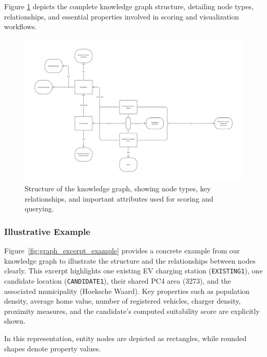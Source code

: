 \documentclass{article}
\begin{document}
Figure \ref{fig:graph_structure} depicts the complete knowledge graph structure, detailing node types, relationships, and essential properties involved in scoring and visualization workflows.

\begin{figure}[htbp]
	\centering
	\includegraphics[width=\textwidth]{KnowledgeGraphGroup7.png}
	\caption{Structure of the knowledge graph, showing node types, key relationships, and important attributes used for scoring and querying.}
	\label{fig:graph_structure}
\end{figure}

\subsubsection{Illustrative Example}

Figure~\ref{fig:graph_excerpt_example} provides a concrete example from our knowledge graph to illustrate the structure and the relationships between nodes clearly. This excerpt highlights one existing EV charging station (\texttt{EXISTING1}), one candidate location (\texttt{CANDIDATE1}), their shared PC4 area (3273), and the associated municipality (Hoeksche Waard). Key properties such as population density, average home value, number of registered vehicles, charger density, proximity measures, and the candidate's computed suitability score are explicitly shown.

In this representation, entity nodes are depicted as rectangles, while rounded shapes denote property values.
\end{document}
